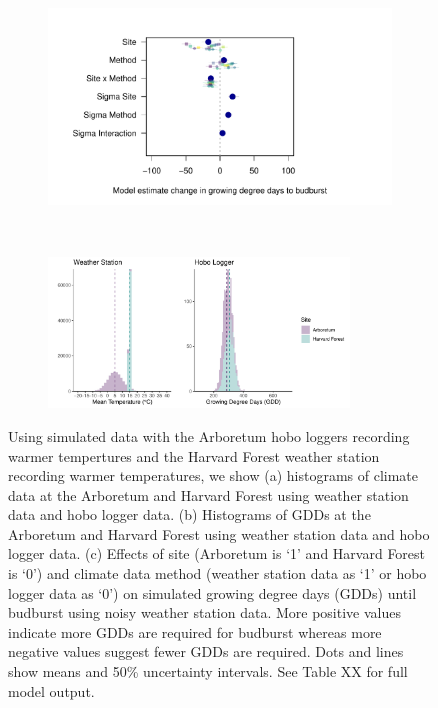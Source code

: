 \documentclass{article}\usepackage[]{graphicx}\usepackage[]{color}
\begin{document}
\begin{figure}
  \begin{subfigure}{.5\linewidth}
    \caption{}
      \centering
      \includegraphics[height=7cm, width=11cm]{..//analyses/figures/muplot_urbws.pdf}
      \label{fig:muploturbanws}
  \end{subfigure}%
    \begin{subfigure}{.5\linewidth}
      \caption{}
      \centering
      \includegraphics[height=4cm, width=8cm]{..//analyses/figures/gdd_methods_urbanws.pdf}
    \label{fig:gddurbanws}
  \end{subfigure}
\caption{ Using simulated data with the Arboretum hobo loggers recording warmer tempertures and the Harvard Forest weather station recording warmer temperatures, we show (a) histograms of climate data at the Arboretum and Harvard Forest using weather station data and hobo logger data. (b) Histograms of GDDs at the Arboretum and Harvard Forest using weather station data and hobo logger data. (c) Effects of site (Arboretum is `1' and Harvard Forest is `0') and climate data method (weather station data as `1' or hobo logger data as `0') on simulated growing degree days (GDDs) until budburst using noisy weather station data. More positive values indicate more GDDs are required for budburst whereas more negative values suggest fewer GDDs are required. Dots and lines show means and 50\% uncertainty intervals. See Table XX for full model output.}
\label{fig:urbanws}
\end{figure}
\end{document}
